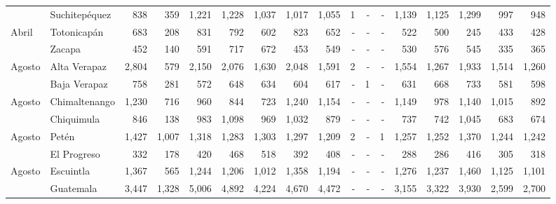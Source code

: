 \begin{landscape}
\begin{center}
\begin{longtable}{llrrrrrrrrrrrrrrr}
			\rowcolor{color1!5!white}\multicolumn{1}{l}{	\footnotesize	 Abril 	}&	 Suchitepéquez 	&	 838 	&	 359 	&	 1,221 	&	 1,228 	&	 1,037 	&	 1,017 	&	 1,055 	&	 1 	&	 -   	&	 -   	&	 1,139 	&	 1,125 	&	 1,299 	&	 997 	&	 948 	\\
			\multicolumn{1}{l}{	\footnotesize	 Abril 	}&	 Totonicapán 	&	 683 	&	 208 	&	 831 	&	 792 	&	 602 	&	 823 	&	 652 	&	 -   	&	 -   	&	 -   	&	 522 	&	 500 	&	 245 	&	 433 	&	 428 	\\
			\rowcolor{color1!5!white}\multicolumn{1}{l}{	\footnotesize	 Abril 	}&	 Zacapa 	&	 452 	&	 140 	&	 591 	&	 717 	&	 672 	&	 453 	&	 549 	&	 -   	&	 -   	&	 -   	&	 530 	&	 576 	&	 545 	&	 335 	&	 365 	\\
			\multicolumn{1}{l}{	\footnotesize	 Agosto 	}&	 Alta Verapaz 	&	 2,804 	&	 579 	&	 2,150 	&	 2,076 	&	 1,630 	&	 2,048 	&	 1,591 	&	 2 	&	 -   	&	 -   	&	 1,554 	&	 1,267 	&	 1,933 	&	 1,514 	&	 1,260 	\\
			\rowcolor{color1!5!white}\multicolumn{1}{l}{	\footnotesize	 Agosto 	}&	 Baja Verapaz 	&	 758 	&	 281 	&	 572 	&	 648 	&	 634 	&	 604 	&	 617 	&	 -   	&	 1 	&	 -   	&	 631 	&	 668 	&	 733 	&	 581 	&	 598 	\\
			\multicolumn{1}{l}{	\footnotesize	 Agosto 	}&	 Chimaltenango 	&	 1,230 	&	 716 	&	 960 	&	 844 	&	 723 	&	 1,240 	&	 1,154 	&	 -   	&	 -   	&	 -   	&	 1,149 	&	 978 	&	 1,140 	&	 1,015 	&	 892 	\\
			\rowcolor{color1!5!white}\multicolumn{1}{l}{	\footnotesize	 Agosto 	}&	 Chiquimula 	&	 846 	&	 138 	&	 983 	&	 1,098 	&	 969 	&	 1,032 	&	 879 	&	 -   	&	 -   	&	 -   	&	 737 	&	 742 	&	 1,045 	&	 683 	&	 674 	\\
			\multicolumn{1}{l}{	\footnotesize	 Agosto 	}&	 Petén 	&	 1,427 	&	 1,007 	&	 1,318 	&	 1,283 	&	 1,303 	&	 1,297 	&	 1,209 	&	 2 	&	 -   	&	 1 	&	 1,257 	&	 1,252 	&	 1,370 	&	 1,244 	&	 1,242 	\\
			\rowcolor{color1!5!white}\multicolumn{1}{l}{	\footnotesize	 Agosto 	}&	 El Progreso 	&	 332 	&	 178 	&	 420 	&	 468 	&	 518 	&	 392 	&	 408 	&	 -   	&	 -   	&	 -   	&	 288 	&	 286 	&	 416 	&	 305 	&	 318 	\\
			\multicolumn{1}{l}{	\footnotesize	 Agosto 	}&	 Escuintla 	&	 1,367 	&	 565 	&	 1,244 	&	 1,206 	&	 1,012 	&	 1,358 	&	 1,194 	&	 -   	&	 -   	&	 -   	&	 1,276 	&	 1,237 	&	 1,460 	&	 1,125 	&	 1,101 	\\
			\rowcolor{color1!5!white}\multicolumn{1}{l}{	\footnotesize	 Agosto 	}&	 Guatemala 	&	 3,447 	&	 1,328 	&	 5,006 	&	 4,892 	&	 4,224 	&	 4,670 	&	 4,472 	&	 -   	&	 -   	&	 -   	&	 3,155 	&	 3,322 	&	 3,930 	&	 2,599 	&	 2,700 	\\

\end{longtable}
\end{center}
\end{landscape}

